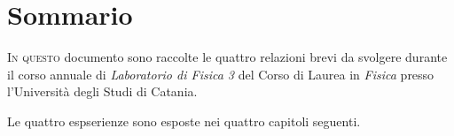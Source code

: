 \chapter{Sommario}
    \lettrine[loversize=0.08, lines=2]{I}{n questo} documento sono raccolte le quattro relazioni brevi da svolgere durante il corso annuale di \emph{Laboratorio di Fisica 3} del Corso di Laurea in \emph{Fisica} presso l'Università degli Studi di Catania.

    Le quattro espserienze sono esposte nei quattro capitoli seguenti. 
